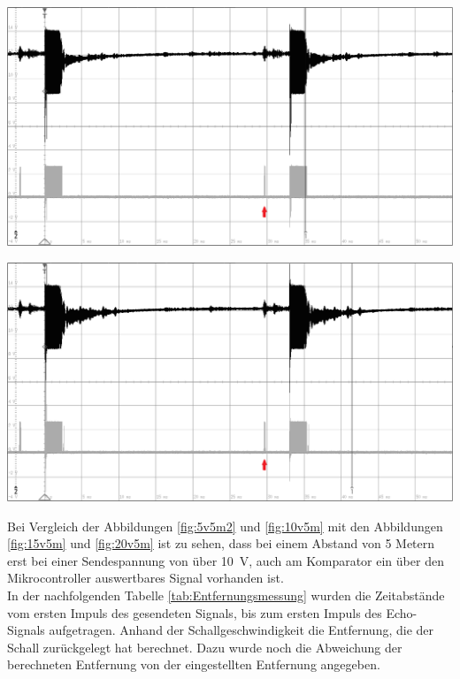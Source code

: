 \begin{minipage}{0.5\textwidth}
\includegraphics[width=1\textwidth%
]{Abbildungen/MessungenP2/15V/5mb.PNG}
\label{fig:15v5m}
\end{minipage}
\begin{minipage}{0.5\textwidth}
\includegraphics[width=1\textwidth%
]{Abbildungen/MessungenP2/20V/5mb.PNG}
\label{fig:20v5m}
\end{minipage}
Bei Vergleich der Abbildungen \ref{fig:5v5m2} und \ref{fig:10v5m} mit den Abbildungen \ref{fig:15v5m} und \ref{fig:20v5m}  ist zu sehen, dass bei einem Abstand von 5 Metern erst bei einer Sendespannung von über 10~V, auch am Komparator ein über den Mikrocontroller auswertbares Signal vorhanden ist. \\
In der nachfolgenden Tabelle \ref{tab:Entfernungsmessung} wurden die Zeitabstände vom ersten Impuls des gesendeten Signals, bis zum ersten Impuls des Echo-Signals aufgetragen. Anhand der Schallgeschwindigkeit die Entfernung, die der Schall zurückgelegt hat berechnet. Dazu wurde noch die Abweichung der berechneten Entfernung von der eingestellten Entfernung angegeben.\\


